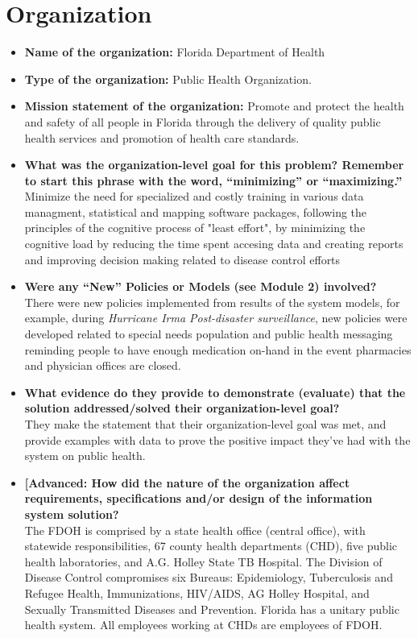 \documentclass{article}
\begin{document}
\section{Organization}
\begin{itemize}
\item{\textbf{Name of the organization:}} Florida Department of Health

\item{\textbf{Type of the organization:}} Public Health Organization.

\item{\textbf{Mission statement of the organization:}} Promote and protect the health and safety of all people in Florida through the delivery of quality public health services and promotion of health care standards.

\item{\textbf{What was the organization-level goal for this problem? Remember to start this phrase with the word, “minimizing” or “maximizing.”}}\\
Minimize the need for specialized and costly training in various data managment, statistical and mapping software packages, following the principles of the cognitive process of "least effort", by minimizing the cognitive load by reducing the time spent accesing data and creating reports and improving decision making related to disease control efforts
\item{\textbf{Were any “New” Policies or Models (see Module 2) involved?}}\\
There were new policies implemented from results of the system models, for example, during \textit{Hurricane Irma Post-disaster surveillance}, new policies were developed related to special needs population and public health messaging reminding people to have enough medication on-hand in the event pharmacies and physician offices are closed.

\item{\textbf{What evidence do they provide to demonstrate (evaluate) that the solution addressed/solved their organization-level goal?}}\\
They make the statement that their organization-level goal was met, and provide examples with data to prove the positive impact they've had with the system on public health.

\item{\textbf{[Advanced: How did the nature of the organization affect requirements, specifications and/or design of the information system solution?}}\\
The FDOH is comprised by a state health office (central office), with statewide responsibilities, 67 county health departments (CHD), five public health laboratories, and A.G. Holley State TB Hospital. The Division of Disease Control compromises six Bureaus: Epidemiology, Tuberculosis and Refugee Health, Immunizations, HIV/AIDS, AG Holley Hospital, and Sexually Transmitted Diseases and Prevention. Florida has a unitary public health system. All employees working at CHDs are employees of FDOH.


\end{itemize}
\end{document}
